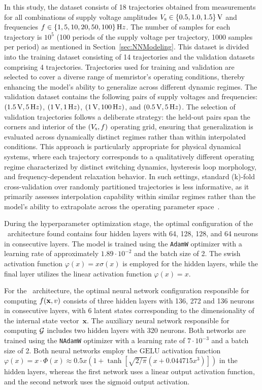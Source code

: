 \documentclass{ieeeaccess}
\begin{document}
In this study, the dataset consists of 18 trajectories obtained from measurements for all combinations of supply voltage amplitudes \(V_{\mathrm s}  \in \{0.5,1.0,1.5\}\,{\mathrm V}\) and frequencies \(f \in \{1,5,10,20,50,100\}\,{\mathrm Hz}\). The number of samples for each trajectory is \(10^5\) (100 periods of the supply voltage per trajectory, 1000 samples per period) as mentioned in Section~\ref{sec:NNModeling}. 
This dataset is divided into the training dataset consisting of 14 trajectories and the validation datasets comprising 4 trajectories.
Trajectories used for training and validation are selected to cover a diverse range of memristor's operating conditions, thereby enhancing the model's ability to generalize across different dynamic regimes.
The validation dataset contains the following pairs of supply voltages and frequencies: \((1.5\,{\mathrm V}, 5\,{\mathrm Hz})\), \((1\,{\mathrm V}, 1\,{\mathrm Hz})\), \((1\,{\mathrm V}, 100\,{\mathrm Hz})\), and \((0.5\,{\mathrm V}, 5\,{\mathrm Hz})\). The selection of validation trajectories follows a deliberate strategy: the held-out pairs span the corners and interior of the \((V_{\mathrm s}, f)\) operating grid, ensuring that generalization is evaluated across dynamically distinct regimes rather than within interpolated conditions. This approach is particularly appropriate for physical dynamical systems, where each trajectory corresponds to a qualitatively different operating regime characterized by distinct switching dynamics, hysteresis loop morphology, and frequency-dependent relaxation behavior. In such settings, standard (k)-fold cross-validation over randomly partitioned trajectories is less informative, as it primarily assesses interpolation capability within similar regimes rather than the model's ability to extrapolate across the operating parameter space~\cite{Arlot2010}.

During the hyperparameter optimization stage, the optimal configuration of the \MemODEOne\ architecture found contains four hidden layers with 64, 128, 128, and 64 neurons in consecutive layers. The model is trained using the \texttt{AdamW} optimizer with a learning rate of approximately \(1.89 \cdot 10^{-2}\) and the batch size of 2. The swish activation function \(\varphi(x)=x\sigma(x)\) is employed for the hidden layers, while the final layer utilizes the linear activation function \(\varphi(x)=x\). 

For the \MemODETwo\ architecture, the optimal neural network configuration responsible for computing \(f(\mathbf{x},v)\) consists of three hidden layers with 136, 272 and 136 neurons in consecutive layers, with 6 latent states corresponding to the dimensionality of the internal state vector~\(\mathbf{x}\). The auxiliary neural network responsible for computing \(\mathcal{G}\) includes two hidden layers with 320 neurons. Both networks are trained using the \texttt{NAdamW} optimizer with a learning rate of \(7 \cdot 10^{-3}\) and a batch size of 2. Both neural networks employ the \(\mathrm{GELU}\) activation function \(\varphi(x) = x \cdot \Phi(x) \approx 0.5 x (1 + \tanh[\sqrt{2/\pi} (x + 0.044715 x^3)]) \) in the hidden layers, whereas the first network uses a \(\mathrm{linear}\) output activation function, and the second network uses the \(\mathrm{sigmoid}\) output activation.
%
\end{document}
